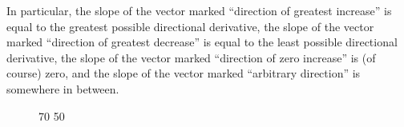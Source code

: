 \documentclass{myarticle}
\theoremstyle{nospace}
\newtheorem{old series theorem}{Theorem}
\newenvironment{series theorem}{\begin{mdframed}\begin{old series theorem}}{\end{old series theorem}\end{mdframed}}
\begin{document}
In particular, the slope of the vector marked ``direction of greatest increase'' is equal to the greatest possible directional derivative, the slope of the vector marked ``direction of greatest decrease'' is equal to the least possible directional derivative, the slope of the vector marked ``direction of zero increase'' is (of course) zero, and the slope of the vector marked ``arbitrary direction'' is somewhere in between.

\begin{figure}[htb!] \centering

\tdplotsetmaincoords
{70} %
{50} %


\end{figure}
\end{document}
